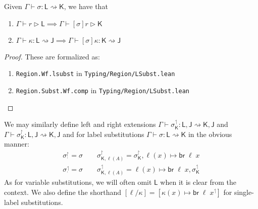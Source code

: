 \documentclass[acmsmall,screen,review]{acmart}
\newcommand{\ms}[1]{\ensuremath{\mathsf{#1}}}
\newcommand{\brb}[2]{\ms{br}\;#1\;#2}
\newcommand{\rupg}[1]{{#1}^\upharpoonright}
\newcommand{\lupg}[1]{{#1}^\upharpoonleft}
\newcommand{\haslb}[3]{#1 \vdash #2 \rhd #3}
\newcommand{\lbsubst}[4]{#1 \vdash #2: #3 \rightsquigarrow #4}
\begin{document}
\begin{lemma}
  Given $\lbsubst{\Gamma}{\sigma}{\ms{L}}{\ms{K}}$, we have that
  \begin{enumerate}[label=(\alph*)]
    \item $\haslb{\Gamma}{r}{\ms{L}} \implies \haslb{\Gamma}{[\sigma]r}{\ms{K}}$
    \item $\lbsubst{\Gamma}{\kappa}{\ms{L}}{\ms{J}} 
      \implies \lbsubst{\Gamma}{[\sigma]\kappa}{\ms{K}}{\ms{J}}$
  \end{enumerate}
\end{lemma}
\begin{proof}
  These are formalized as:
  \begin{enumerate}[label=(\alph*)]
    \item \texttt{Region.Wf.lsubst} in \texttt{Typing/Region/LSubst.lean}
    \item \texttt{Region.Subst.Wf.comp} in \texttt{Typing/Region/LSubst.lean}
  \end{enumerate}
\end{proof}

We may similarly define left and right extensions $\lbsubst{\Gamma}{\lupg{\sigma}_{\ms{K}}}{\ms{L},
\ms{J}}{\ms{K}, \ms{J}}$ and $\lbsubst{\Gamma}{\rupg{\sigma}_{\ms{K}}}{\ms{L}, \ms{J}}{\ms{K},
\ms{J}}$ and for label substitutions $\lbsubst{\Gamma}{\sigma}{\ms{L}}{\ms{K}}$ in the obvious
manner:
\begin{gather}
  \rupg{\sigma}_{\cdot} = \sigma \qquad 
  \rupg{\sigma}_{\ms{K}, \ell(A)} = \rupg{\sigma}_{\ms{K}}, \ell(x) \mapsto \brb{\ell}{x} \\
  \lupg{\sigma}_{\cdot} = \sigma \qquad
  \lupg{\sigma}_{\ms{K}, \ell(A)} = \ell(x) \mapsto \brb{\ell}{x}, \lupg{\sigma}_{\ms{K}}
\end{gather}
As for variable substitutions, we will often omit $\ms{L}$ when it is clear from the context.
We also define the shorthand $[\ell / \kappa] = [\lupg{\kappa(x) \mapsto \brb{\ell}{x}}]$ for
single-label substitutions.
\end{document}
